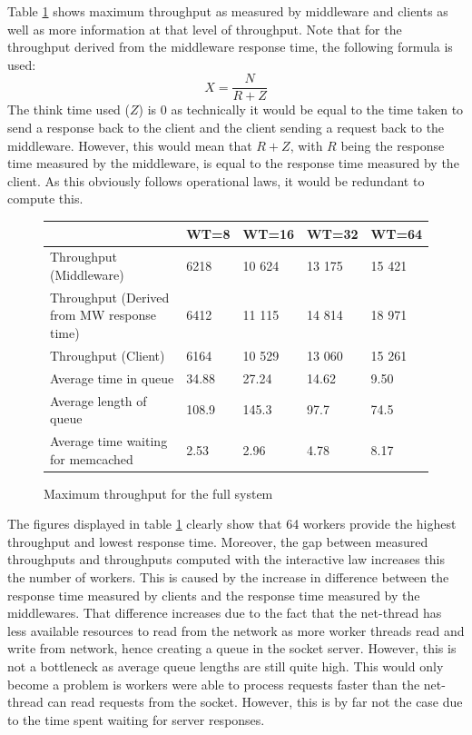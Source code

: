 \documentclass[11pt,a4paper]{article}
\begin{document}
Table \ref{table::max_through_section_4} shows maximum throughput as measured by middleware and clients as well as more information at that level of throughput. Note that for the throughput derived from the middleware response time, the following formula is used:
$$
X = \frac{N}{R + Z}
$$
The think time used ($Z$) is 0 as technically it would be equal to the time taken to send a response back to the client and the client sending a request back to the middleware. However, this would mean that $R + Z$, with $R$ being the response time measured by the middleware, is equal to the response time measured by the client. As this obviously follows operational laws, it would be redundant to compute this.

\begin{figure}[!h]
    \centering
	\begin{tabular}{|l|p{1.5cm}|p{1.5cm}|p{1.5cm}|p{1.5cm}|}
		\hline                                            &   WT=8 &   WT=16 &   WT=32 &   WT=64 \\
		\hline Throughput (Middleware)                    &   6218 &  10 624 &  13 175 &  15 421 \\
		\hline Throughput (Derived from MW response time) &   6412 &  11 115 &  14 814 &  18 971 \\
		\hline Throughput (Client)                        &   6164 &  10 529 &  13 060 &  15 261 \\
		\hline Average time in queue                      &  34.88 &   27.24 &   14.62 &    9.50 \\
		\hline Average length of queue                    &  108.9 &   145.3 &    97.7 &    74.5 \\
		\hline Average time waiting for memcached         &   2.53 &    2.96 &    4.78 &    8.17 \\
		\hline
	\end{tabular}
    \caption{Maximum throughput for the full system}
    \label{table::max_through_section_4}
\end{figure}

The figures displayed in table \ref{table::max_through_section_4} clearly show that 64 workers provide the highest throughput and lowest response time. Moreover, the gap between measured throughputs and throughputs computed with the interactive law increases this the number of workers. This is caused by the increase in difference between the response time measured by clients and the response time measured by the middlewares. That difference increases due to the fact that the net-thread has less available resources to read from the network as more worker threads read and write from network, hence creating a queue in the socket server. However, this is not a bottleneck as average queue lengths are still quite high. This would only become a problem is workers were able to process requests faster than the net-thread can read requests from the socket. However, this is by far not the case due to the time spent waiting for server responses.
\end{document}
